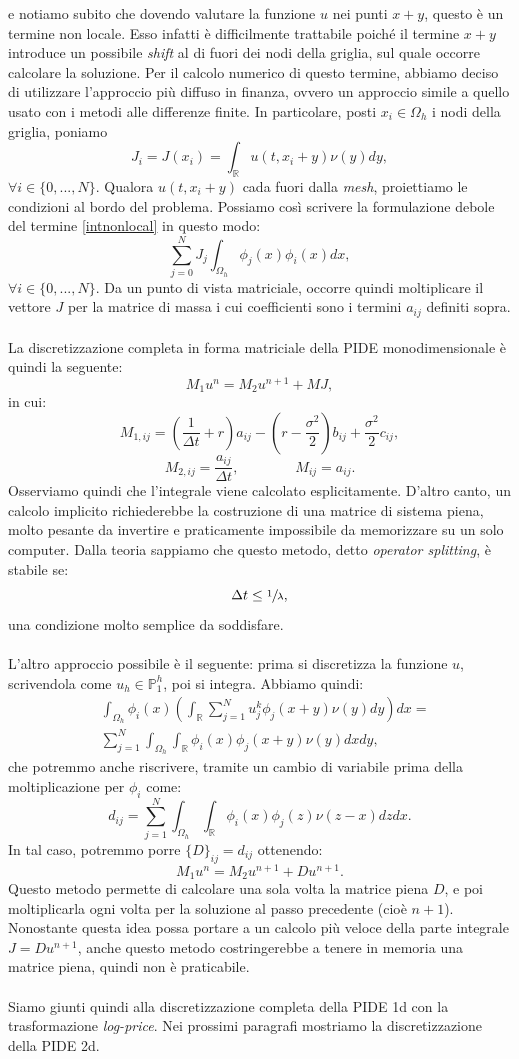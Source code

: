\documentclass[a4paper,10pt]{report}
\theoremstyle{plain}
\theoremstyle{definition}
\theoremstyle{remark}
\begin{document}
e notiamo subito che dovendo valutare la funzione $u$ nei punti $x+y$, questo \`e un termine non locale. Esso infatti \`e difficilmente trattabile poich\'e il termine $x+y$ introduce un possibile \emph{shift} al di fuori dei nodi della griglia, sul quale occorre calcolare la soluzione. Per il calcolo numerico di questo termine, abbiamo deciso di utilizzare l'approccio pi\`u diffuso in finanza, ovvero un approccio simile a quello usato con i metodi alle differenze finite. In particolare, posti $x_i\in\Omega_h$ i nodi della griglia, poniamo $$J_i=J(x_i)=\int_\mathbb{R}u(t,x_i+y)\nu(y)dy,$$ $\forall i\in\{0,...,N\}.$ Qualora $u(t,x_i+y)$ cada fuori dalla \emph{mesh}, proiettiamo le condizioni al bordo del problema. Possiamo cos\`i scrivere la formulazione debole del termine \ref{intnonlocal} in questo modo: $$\sum_{j=0}^{N}J_j\int_{\Omega_h}\phi_j(x)\phi_i(x)dx,$$ $\forall i\in\{0,...,N\}.$ Da un punto di vista matriciale, occorre quindi moltiplicare il vettore $J$ per la matrice di massa i cui coefficienti sono i termini $a_{ij}$ definiti sopra.\\\\La discretizzazione completa in forma matriciale della PIDE monodimensionale \`e quindi la seguente:$$M_1u^n=M_2u^{n+1}+MJ,$$ in cui: $$M_{1,ij}=\left(\frac{1}{\Delta t}+r\right)a_{ij}-\left(r-\frac{\sigma^2}{2}\right)b_{ij}+\frac{\sigma^2}{2}c_{ij},$$ $$M_{2,ij}=\frac{a_{ij}}{\Delta t},\qquad\qquad M_{ij}=a_{ij}.$$Osserviamo quindi che l'integrale viene calcolato esplicitamente. D'altro canto, un calcolo implicito richiederebbe la costruzione di una matrice di sistema piena, molto pesante da invertire e praticamente impossibile da memorizzare su un solo computer. Dalla teoria sappiamo che questo metodo, detto \emph{operator splitting}, \`e stabile se: $$\Delta t\leq\sfrac{1}{\lambda},$$una condizione molto semplice da soddisfare.\\\\L'altro approccio possibile \`e il seguente: prima si discretizza la funzione $u$, scrivendola come $u_h\in\mathbb{P}^h_1$, poi si integra. Abbiamo quindi:
\begin{align*}
&\int_{\Omega_h}\phi_i(x)\left( \int_{\mathbb{R}}\sum_{j=1}^N u_j^k \phi_j(x+y)\nu(y)dy \right)dx=\\ 
&\sum_{j=1}^N  \int_{\Omega_h}\int_{\mathbb{R}} \phi_i(x)\phi_j(x+y)\nu(y)dxdy,
\end{align*}
che potremmo anche riscrivere, tramite un cambio di variabile prima della moltiplicazione per $\phi_i$ come: $$d_{ij}=\sum_{j=1}^N  \int_{\Omega_h} \int_{\mathbb{R}} \phi_i(x)\phi_j(z)\nu(z-x)dzdx.$$In tal caso, potremmo porre $\{D\}_{ij}=d_{ij}$ ottenendo:$$M_1u^n=M_2u^{n+1}+Du^{n+1}.$$Questo metodo permette di calcolare una sola volta la matrice piena $D$, e poi moltiplicarla ogni volta per la soluzione al passo precedente (cio\`e $n+1$). Nonostante questa idea possa portare a un calcolo pi\`u veloce della parte integrale $J=Du^{n+1}$, anche questo metodo costringerebbe a tenere in memoria una matrice piena, quindi non \`e praticabile.\\\\Siamo giunti quindi alla discretizzazione completa della PIDE 1d con la trasformazione \emph{log-price}. Nei prossimi paragrafi mostriamo la discretizzazione della PIDE 2d.
\end{document}
